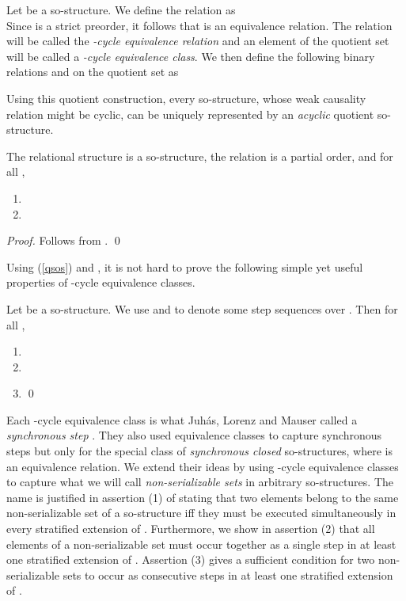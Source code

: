 \documentclass{llncs}
\begin{document}
Let  be a so-structure. We define the relation  as\\


Since  is a strict preorder, it follows that  is an equivalence relation. The relation  will be called the \emph{-cycle equivalence relation} and an element of the quotient set  will be called a \emph{-cycle equivalence class}.  We then define the following binary relations  and  on  the quotient set  as


Using this quotient construction,  every so-structure, whose weak causality relation might be cyclic, can be uniquely represented by an \emph{acyclic} quotient so-structure. 
\begin{proposition} The relational structure  is a so-structure, the relation  is a partial order, and for all ,
\begin{enumerate}
\item  
\item   
\end{enumerate}
\end{proposition}
\begin{proof} Follows from . \qed
\end{proof}

Using (\ref{qsos}) and , it is not hard to prove the following simple yet useful properties of -cycle equivalence classes.

\begin{proposition} Let  be a so-structure. We use  and   to denote some step sequences over . Then for all ,
	\begin{enumerate}
	\item 
	\item 
	\item  \qed
	\end{enumerate}
\label{prop:covlsos}
\end{proposition}


Each -cycle equivalence class is what Juh\'as, Lorenz and Mauser called a \emph{synchronous step} \cite{JLM06,JLM08}. They also used equivalence classes to capture synchronous steps but only for the special class of \emph{synchronous closed} so-structures, where  is an equivalence relation. We extend their ideas by using -cycle equivalence classes to capture what we will call  \emph{non-serializable sets} in arbitrary so-structures. The name is justified in assertion (1) of  stating that two elements belong to the same non-serializable set of a so-structure  iff they must be executed simultaneously in every stratified extension of . Furthermore, we show in assertion (2) that all elements of a non-serializable set must occur together as a single step in at least one stratified extension of . Assertion (3) gives a sufficient condition for two non-serializable sets to occur as consecutive steps in at least one stratified extension of .
\end{document}
